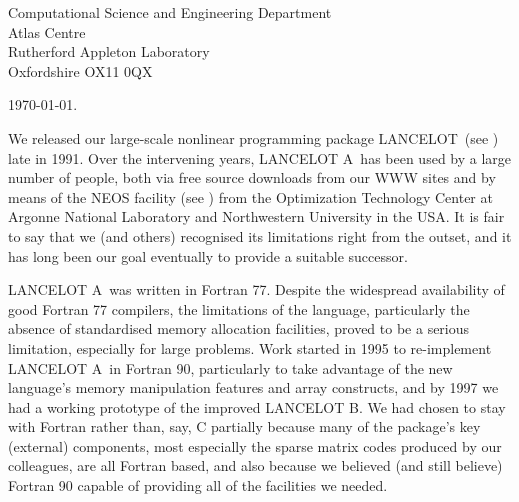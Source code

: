 \documentclass[twoside]{article}
\newcommand{\gal}{{\sf GALAHAD}}
\newcommand{\lan}{{\sf LANCELOT}}
\newcommand{\lana}{{\sf LANCELOT A}}
\newcommand{\lanb}{{\sf LANCELOT B}}
\begin{document}
\begin{titlepage}
\vspace{0.6 cm}

\noindent
Computational Science and Engineering Department
\\
Atlas Centre
\\
Rutherford Appleton Laboratory
\\
Oxfordshire OX11 0QX

\vspace{0.1 cm}
\noindent \today .



\end{titlepage}




\setcounter{page}{1}

We released our large-scale nonlinear programming package \lan\
(see ) late in 1991. Over the intervening
years, \lana\ has been used by a large number of people, both
via free source downloads from our WWW sites
and by means of the NEOS facility (see )
from the Optimization Technology Center at
Argonne National Laboratory and Northwestern University in the USA.
It is fair to say that we (and others) recognised its limitations
right from the outset, and it has long been our goal eventually to provide
a suitable successor.

\lana\ was written in Fortran 77.
Despite the widespread availability of good
Fortran 77 compilers, the limitations of the language, particularly
the absence of standardised memory allocation facilities, proved to be
a serious limitation, especially for large problems.
Work started in 1995 to re-implement \lana\ in
Fortran 90, particularly to take advantage of the new language's
memory manipulation features and array constructs, and by 1997 we had a
working prototype of the improved \lanb. We had chosen to stay with
Fortran rather than, say, C partially because many of the package's
key (external) components, most especially the \citebb{hsl:2002}
sparse matrix codes
produced by our colleagues, are all Fortran based, and also because
we believed (and still believe) Fortran 90 capable of providing
all of the facilities we needed.
\end{document}
